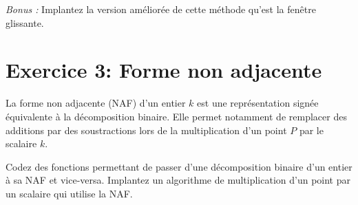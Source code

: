 \documentclass[french,a4paper,11pt]{exam}
\begin{document}
\emph{Bonus :} Implantez la version améliorée de cette méthode qu'est la fenêtre
glissante.


\section*{Exercice 3: Forme non adjacente}
La forme non adjacente (NAF) d'un entier \(k\) est une représentation signée équivalente à
la décomposition binaire. Elle permet notamment de remplacer des
additions par des soustractions lors de la multiplication d'un point \(P\) par le
scalaire \(k\).
\begin{questions}
  \question Codez des fonctions permettant de passer d'une décomposition binaire
  d'un entier à sa NAF et vice-versa.
  \question Implantez un algorithme de multiplication d'un point par un scalaire
  qui utilise la NAF.
\end{questions}
\end{document}
